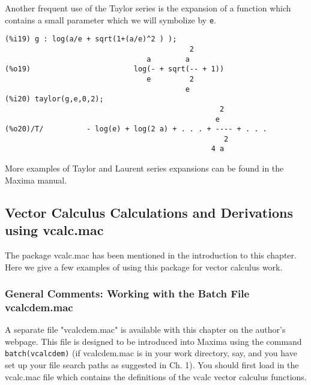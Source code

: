 \documentclass[12pt]{article}
\begin{document}
Another frequent use of the Taylor series is the expansion of a function which contains
  a small parameter which we will symbolize by \verb|e|.
\small
\begin{verbatim}
(%i19) g : log(a/e + sqrt(1+(a/e)^2 ) );
                                           2
                                 a        a
(%o19)                        log(- + sqrt(-- + 1))
                                 e         2
                                          e
(%i20) taylor(g,e,0,2);
                                                  2
                                                 e
(%o20)/T/          - log(e) + log(2 a) + . . . + ---- + . . .
                                                   2
                                                4 a
\end{verbatim}
\normalsize

More examples of Taylor and Laurent series expansions can be found in the
  Maxima manual.


\subsection{Vector Calculus Calculations and Derivations using vcalc.mac}
The package vcalc.mac has been mentioned in the introduction to this chapter.
Here we give a few examples of using this package for vector calculus
  work.

\subsubsection*{General Comments: Working with the Batch File vcalcdem.mac}
A separate file "vcalcdem.mac" is available with this chapter on the author's webpage.
This file is designed to be introduced into Maxima using the command \verb|batch(vcalcdem)|
 (if vcalcdem.mac is in your work directory, say, and you have set up your file search
  paths as suggested in Ch. 1).
You should first load in the vcalc.mac file which contains the definitions of
  the vcalc vector calculus functions.  
\end{document}

